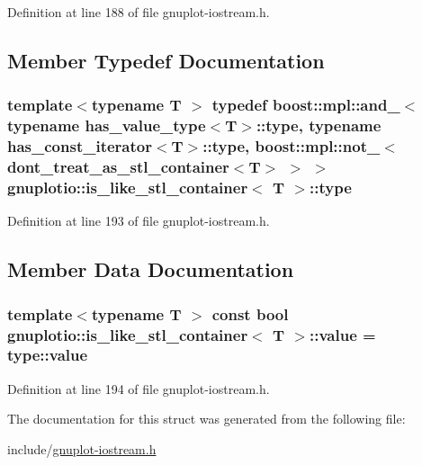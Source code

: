Definition at line 188 of file gnuplot-\/iostream.\+h.



\subsection{Member Typedef Documentation}
\subsubsection[{\texorpdfstring{type}{type}}]{\setlength{\rightskip}{0pt plus 5cm}template$<$typename T $>$ typedef boost\+::mpl\+::and\+\_\+$<$ typename has\+\_\+value\+\_\+type$<$T$>$\+::{\bf type}, typename has\+\_\+const\+\_\+iterator$<$T$>$\+::{\bf type}, boost\+::mpl\+::not\+\_\+$<${\bf dont\+\_\+treat\+\_\+as\+\_\+stl\+\_\+container}$<$T$>$ $>$ $>$ {\bf gnuplotio\+::is\+\_\+like\+\_\+stl\+\_\+container}$<$ T $>$\+::{\bf type}}\hypertarget{structgnuplotio_1_1is__like__stl__container_a050ecfa55e896a27f86d901334f47c6a}{}\label{structgnuplotio_1_1is__like__stl__container_a050ecfa55e896a27f86d901334f47c6a}


Definition at line 193 of file gnuplot-\/iostream.\+h.



\subsection{Member Data Documentation}
\subsubsection[{\texorpdfstring{value}{value}}]{\setlength{\rightskip}{0pt plus 5cm}template$<$typename T $>$ const bool {\bf gnuplotio\+::is\+\_\+like\+\_\+stl\+\_\+container}$<$ T $>$\+::value = type\+::value\hspace{0.3cm}{\ttfamily [static]}}\hypertarget{structgnuplotio_1_1is__like__stl__container_ae4761e6e807deed732e41118c785c8a4}{}\label{structgnuplotio_1_1is__like__stl__container_ae4761e6e807deed732e41118c785c8a4}


Definition at line 194 of file gnuplot-\/iostream.\+h.



The documentation for this struct was generated from the following file\+:\begin{DoxyCompactItemize}
\item 
include/\hyperlink{gnuplot-iostream_8h}{gnuplot-\/iostream.\+h}\end{DoxyCompactItemize}
